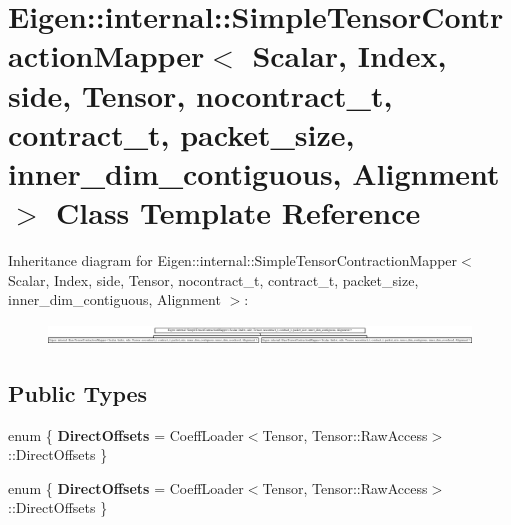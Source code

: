 \hypertarget{class_eigen_1_1internal_1_1_simple_tensor_contraction_mapper}{}\section{Eigen\+:\+:internal\+:\+:Simple\+Tensor\+Contraction\+Mapper$<$ Scalar, Index, side, Tensor, nocontract\+\_\+t, contract\+\_\+t, packet\+\_\+size, inner\+\_\+dim\+\_\+contiguous, Alignment $>$ Class Template Reference}
\label{class_eigen_1_1internal_1_1_simple_tensor_contraction_mapper}
Inheritance diagram for Eigen\+:\+:internal\+:\+:Simple\+Tensor\+Contraction\+Mapper$<$ Scalar, Index, side, Tensor, nocontract\+\_\+t, contract\+\_\+t, packet\+\_\+size, inner\+\_\+dim\+\_\+contiguous, Alignment $>$\+:\begin{figure}[H]
\begin{center}
\leavevmode
\includegraphics[height=0.557214cm]{class_eigen_1_1internal_1_1_simple_tensor_contraction_mapper}
\end{center}
\end{figure}
\subsection*{Public Types}
\begin{DoxyCompactItemize}
\item 
\mbox{\label{class_eigen_1_1internal_1_1_simple_tensor_contraction_mapper_ac5c7cdd1350b50d2ba02e29cf0be48f3}} 
enum \{ {\bfseries Direct\+Offsets} = Coeff\+Loader$<$Tensor, Tensor\+:\+:Raw\+Access$>$\+:\+:Direct\+Offsets
 \}
\item 
\mbox{\label{class_eigen_1_1internal_1_1_simple_tensor_contraction_mapper_a0ed9b72c9e59242adf0a027a885843c0}} 
enum \{ {\bfseries Direct\+Offsets} = Coeff\+Loader$<$Tensor, Tensor\+:\+:Raw\+Access$>$\+:\+:Direct\+Offsets
 \}
\end{DoxyCompactItemize}
